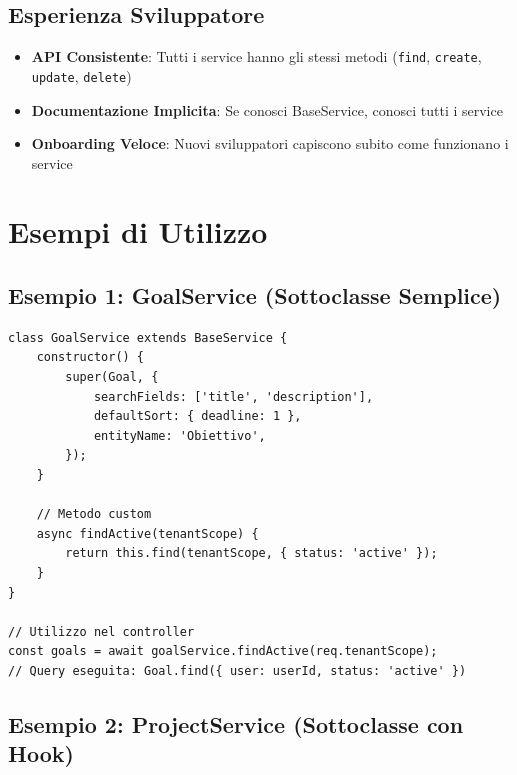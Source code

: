 \documentclass[11pt,a4paper]{article}
\begin{document}
\subsection{Esperienza Sviluppatore}

\begin{itemize}
    \item \textbf{API Consistente}: Tutti i service hanno gli stessi metodi (\texttt{find}, \texttt{create}, \texttt{update}, \texttt{delete})
    \item \textbf{Documentazione Implicita}: Se conosci BaseService, conosci tutti i service
    \item \textbf{Onboarding Veloce}: Nuovi sviluppatori capiscono subito come funzionano i service
\end{itemize}

\section{Esempi di Utilizzo}

\subsection{Esempio 1: GoalService (Sottoclasse Semplice)}

\begin{lstlisting}
class GoalService extends BaseService {
    constructor() {
        super(Goal, {
            searchFields: ['title', 'description'],
            defaultSort: { deadline: 1 },
            entityName: 'Obiettivo',
        });
    }
    
    // Metodo custom
    async findActive(tenantScope) {
        return this.find(tenantScope, { status: 'active' });
    }
}

// Utilizzo nel controller
const goals = await goalService.findActive(req.tenantScope);
// Query eseguita: Goal.find({ user: userId, status: 'active' })
\end{lstlisting}

\subsection{Esempio 2: ProjectService (Sottoclasse con Hook)}
\end{document}
